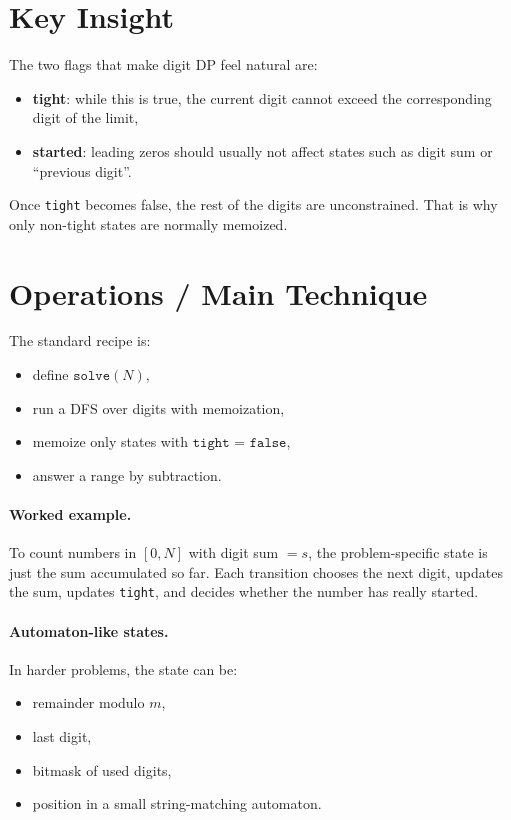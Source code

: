 \section*{Key Insight}

The two flags that make digit DP feel natural are:

\begin{itemize}
  \item \textbf{tight}: while this is true, the current digit cannot exceed the corresponding digit of the limit,
  \item \textbf{started}: leading zeros should usually not affect states such as digit sum or ``previous digit''.
\end{itemize}

Once \texttt{tight} becomes false, the rest of the digits are unconstrained. That is why only non-tight states are
normally memoized.

\section*{Operations / Main Technique}

The standard recipe is:

\begin{itemize}
  \item define \(\texttt{solve}(N)\),
  \item run a DFS over digits with memoization,
  \item memoize only states with \(\texttt{tight = false}\),
  \item answer a range by subtraction.
\end{itemize}

\paragraph{Worked example.}
To count numbers in \([0, N]\) with digit sum \(= s\), the problem-specific state is just the sum accumulated so far.
Each transition chooses the next digit, updates the sum, updates \texttt{tight}, and decides whether the number has
really started.

\paragraph{Automaton-like states.}
In harder problems, the state can be:

\begin{itemize}
  \item remainder modulo \(m\),
  \item last digit,
  \item bitmask of used digits,
  \item position in a small string-matching automaton.
\end{itemize}

